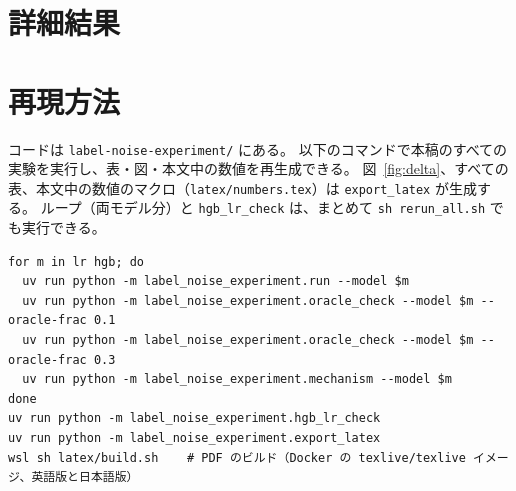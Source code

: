 \documentclass[a4paper,10pt]{ltjsarticle}
\newcommand{\method}[1]{\texttt{#1}}
\begin{document}
\appendix
\clearpage
\section{詳細結果}

\begin{table}[htbp]
  \centering
  \caption{ノイズの種類と率ごとの $\Delta$（pt、全手法）。先頭行は \method{baseline} の精度（\%）。}
  \label{tab:noise-all}
  \scriptsize
  \setlength{\tabcolsep}{4pt}
  
\end{table}

\begin{table}[htbp]
  \centering
  \caption{データセットごとの $\Delta$（pt、全手法、3 ノイズ $\times$ 2 率 $\times$ 5 シードの平均）。先頭行は \method{baseline} の精度（\%）。}
  \label{tab:dataset-all}
  \scriptsize
  
\end{table}

\begin{table}[htbp]
  \centering
  \caption{HGB の学習率の確認。各シードの学習データ内での 5 分割交差検証の精度（\%、真のラベル、テストデータは不使用）。5 シードの平均（最小--最大）。}
  \label{tab:hgb-lr}
  \footnotesize
  
\end{table}

\clearpage
\section{再現方法}
コードは \texttt{label-noise-experiment/} にある。
以下のコマンドで本稿のすべての実験を実行し、表・図・本文中の数値を再生成できる。
図~\ref{fig:delta}、すべての表、本文中の数値のマクロ（\texttt{latex/numbers.tex}）は \texttt{export\_latex} が生成する。
ループ（両モデル分）と \texttt{hgb\_lr\_check} は、まとめて \texttt{sh rerun\_all.sh} でも実行できる。
\begin{verbatim}
for m in lr hgb; do
  uv run python -m label_noise_experiment.run --model $m
  uv run python -m label_noise_experiment.oracle_check --model $m --oracle-frac 0.1
  uv run python -m label_noise_experiment.oracle_check --model $m --oracle-frac 0.3
  uv run python -m label_noise_experiment.mechanism --model $m
done
uv run python -m label_noise_experiment.hgb_lr_check
uv run python -m label_noise_experiment.export_latex
wsl sh latex/build.sh    # PDF のビルド（Docker の texlive/texlive イメージ、英語版と日本語版）
\end{verbatim}
\end{document}
